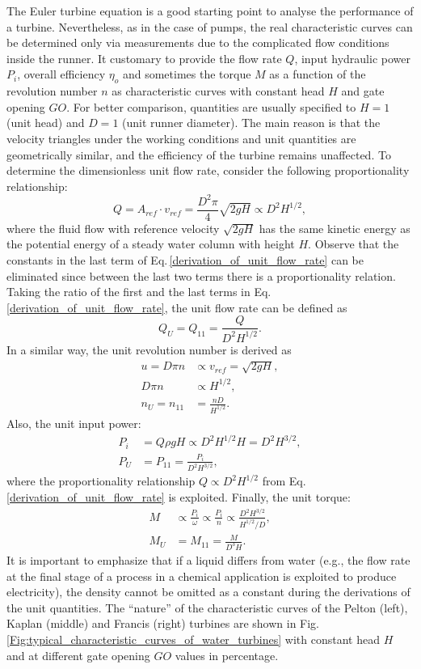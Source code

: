 The Euler turbine equation is a good starting point to analyse the performance of a turbine. Nevertheless, as in the case of pumps, the real characteristic curves can be determined only via measurements due to the complicated flow conditions inside the runner. It customary to provide the flow rate $Q$, input hydraulic power $P_i$, overall efficiency $\eta_o$ and sometimes the torque $M$ as a function of the revolution number $n$ as characteristic curves with constant head $H$ and gate opening $GO$. For better comparison, quantities are usually specified to $H=1$ (unit head) and $D=1$ (unit runner diameter). The main reason is that the velocity triangles under the working conditions and unit quantities are geometrically similar, and the efficiency of the turbine remains unaffected. To determine the dimensionless unit flow rate, consider the following proportionality relationship:
%
\begin{equation} \label{derivation_of_unit_flow_rate}
Q = A_{ref} \cdot v_{ref} = \frac{D^2 \pi}{4} \sqrt{2gH} \propto D^2 H^{1/2},
\end{equation}
%
where the fluid flow with reference velocity $\sqrt{2gH}$ has the same kinetic energy as the potential energy of a steady water column with height $H$. Observe that the constants in the last term of Eq.\,\eqref{derivation_of_unit_flow_rate} can be eliminated since between the last two terms there is a proportionality relation. Taking the ratio of the first and the last terms in Eq.\,\eqref{derivation_of_unit_flow_rate}, the unit flow rate can be defined as
%
\begin{equation}
Q_U = Q_{11} = \frac{Q}{D^2 H^{1/2}}.
\end{equation}
%
In a similar way, the unit revolution number is derived as
%
\begin{align}
u = D \pi n &\propto v_{ref} = \sqrt{2gH}, \\
D \pi n &\propto H^{1/2}, \\
n_U = n_{11} &= \frac{nD}{H^{1/2}}.
\end{align}
%
Also, the unit input power:
%
\begin{align}
P_i &= Q \rho g H \propto D^2 H^{1/2} H = D^2 H^{3/2}, \\
P_U &= P_{11} = \frac{P_i}{D^2 H^{3/2}},
\end{align}
%
where the proportionality relationship $Q \propto D^2 H^{1/2}$ from Eq.\,\ref{derivation_of_unit_flow_rate} is exploited. Finally, the unit torque:
%
\begin{align}
M &\propto \frac{P_i}{\omega} \propto \frac{P_i}{n} \propto \frac{D^2 H^{3/2}}{H^{1/2}/D}, \\
M_U &= M_{11} = \frac{M}{D^3 H}.
\end{align}
%
It is important to emphasize that if a liquid differs from water (e.g., the flow rate at the final stage of a process in a chemical application is exploited to produce electricity), the density cannot be omitted as a constant during the derivations of the unit quantities. The ``nature'' of the characteristic curves of the Pelton (left), Kaplan (middle) and Francis (right) turbines are shown in Fig.\,\ref{Fig:typical_characteristic_curves_of_water_turbines} with constant head $H$ and at different gate opening $GO$ values in percentage.

